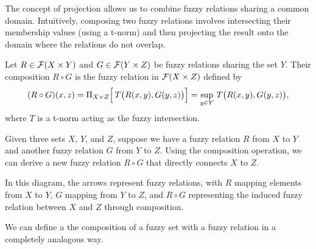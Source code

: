 The concept of projection allows us to combine fuzzy relations sharing a common domain. Intuitively, composing two fuzzy relations involves intersecting their membership values (using a t-norm) and then projecting the result onto the domain where the relations do not overlap.

\begin{definition}
    Let \( R \in \mathcal{F}(X \times Y) \) and \( G \in \mathcal{F}(Y \times Z) \) be fuzzy relations sharing the set \(Y\). Their composition \( R \circ G \) is the fuzzy relation in \(\mathcal{F}(X \times Z)\) defined by
    \[
    (R \circ G)(x,z) = \Pi_{X\times Z}\Bigl[\, T\bigl(R(x,y), G(y,z)\bigr) \Bigr] = \sup_{y\in Y}\, T\bigl(R(x,y), G(y,z)\bigr),
    \]
    where \(T\) is a t-norm acting as the fuzzy intersection.
\end{definition}



Given three sets \(X\), \(Y\), and \(Z\), suppose we have a fuzzy relation \(R\) from \(X\) to \(Y\) and another fuzzy relation \(G\) from \(Y\) to \(Z\). Using the composition operation, we can derive a new fuzzy relation \(R \circ G\) that directly connects \(X\) to \(Z\).

\noindent
\begin{minipage}{0.7\textwidth}
In this diagram, the arrows represent fuzzy relations, with \(R\) mapping elements from \(X\) to \(Y\), \(G\) mapping from \(Y\) to \(Z\), and \(R \circ G\) representing the induced fuzzy relation between \(X\) and \(Z\) through composition.\\
\end{minipage}%
\begin{minipage}{0.3\textwidth}
  \begin{center}
  \end{center}

\end{minipage}


We can define a the composition of a fuzzy set with a fuzzy relation in a completely analogous way. 


